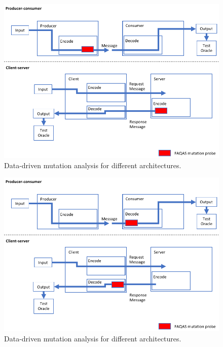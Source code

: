 \begin{figure}[h]
  \centering
    \includegraphics[width=14cm]{images/dataDrivenTestSuiteAugmentationC}
      \caption{Data-driven mutation analysis for different architectures.}
      \label{fig:dataDrivenTestSuiteAugmentationC}
\end{figure}

\begin{figure}[h]
  \centering
    \includegraphics[width=14cm]{images/dataDrivenTestSuiteAugmentationD}
      \caption{Data-driven mutation analysis for different architectures.}
      \label{fig:dataDrivenTestSuiteAugmentationD}
\end{figure}

